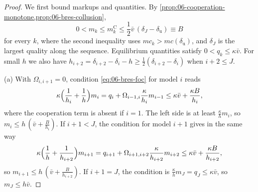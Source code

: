\begin{proof}
We first bound markups and quantities. By \cref{prop:06-cooperation-monotone,prop:06-bres-collusion},
\begin{equation*}
  0 < m_k \le m_k^{\mathrm C} \le \frac{1}{2}\bar v\,(\delta_J - \delta_{\mathrm u}) \equiv B
\end{equation*}
for every $k$, where the second inequality uses $mc_k > mc(\delta_{\mathrm u})$, and $\delta_J$ is the largest
quality along the sequence. Equilibrium quantities satisfy $0 < q_k \le \kappa\bar v$. For small $h$ we also have
$h_{i+2} = \delta_{i+2} - \delta_i - h \ge \frac{1}{2}(\delta_{i+2} - \delta_i)$ when $i + 2 \le J$.

(a) With $\Omega_{i,i+1} = 0$, condition \eqref{eq:06-bres-foc} for model $i$ reads
\begin{equation*}
  \kappa\Bigl(\frac{1}{h_i} + \frac{1}{h}\Bigr)m_i = q_i + \Omega_{i-1,i}\frac{\kappa}{h_i}m_{i-1}
  \le \kappa\bar v + \frac{\kappa B}{h_i},
\end{equation*}
where the cooperation term is absent if $i = 1$. The left side is at least $\frac{\kappa}{h}m_i$, so
$m_i \le h\,(\bar v + \frac{B}{h_i})$. If $i + 1 < J$, the condition for model $i+1$ gives in the same way
\begin{equation*}
  \kappa\Bigl(\frac{1}{h} + \frac{1}{h_{i+2}}\Bigr)m_{i+1} = q_{i+1} + \Omega_{i+1,i+2}\frac{\kappa}{h_{i+2}}m_{i+2}
  \le \kappa\bar v + \frac{\kappa B}{h_{i+2}},
\end{equation*}
so $m_{i+1} \le h\,(\bar v + \frac{B}{h_{i+2}})$. If $i + 1 = J$, the condition is $\frac{\kappa}{h}m_J = q_J \le \kappa\bar v$,
so $m_J \le h\bar v$.


\end{proof}
